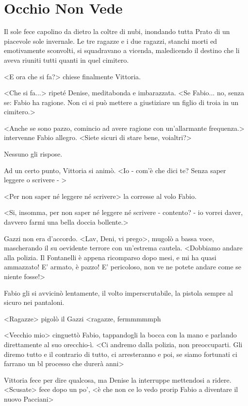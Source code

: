 \chapter{Occhio Non Vede}

Il sole fece capolino da dietro la coltre di nubi, inondando tutta Prato di un piacevole sole invernale. Le tre ragazze e i due ragazzi, stanchi morti ed emotivamente sconvolti, si squadravano a vicenda, maledicendo il destino che li aveva riuniti tutti quanti in quel cimitero.

<E ora che si fa?> chiese finalmente Vittoria.

<Che si fa...> ripeté Denise, meditabonda e imbarazzata. <Se Fabio... no, senza se: Fabio ha ragione. Non ci si può mettere a giustiziare un figlio di troia in un cimitero.>

<Anche se sono pazzo, comincio ad avere ragione con un'allarmante frequenza.> intervenne Fabio allegro. <Siete sicuri di stare bene, voialtri?>

Nessuno gli rispose.

Ad un certo punto, Vittoria si animò. <Io - com'è che dici te? Senza saper leggere o scrivere - >

<Per non saper né leggere né scrivere> la corresse al volo Fabio.

<Si, insomma, per non saper né leggere né scrivere - contento? - io vorrei daver, davvero farmi una bella doccia bollente.>

Gazzi non era d'accordo. <Lav, Deni, vi prego>, mugolò a bassa voce, mascherando il su oevidente terrore con un'estrema cautela. <Dobbiamo andare alla polizia. Il Fontanelli è appena ricomparso dopo mesi, e mi ha quasi ammazzato! E' armato, è pazzo! E' pericoloso, non ve ne potete andare come se niente fosse!>

Fabio gli si avvicinò lentamente, il volto imperscrutabile, la pistola sempre al sicuro nei pantaloni. 

<Ragazze> pigolò il Gazzi <ragazze, fermmmmmph

<Vecchio mio> cinguettò Fabio, tappandogli la bocca con la mano e parlando direttamente al suo orecchio-ì. <Ci andremo dalla polizia, non preoccuparti. Gli diremo tutto e il contrario di tutto, ci arresteranno e poi, se siamo fortunati ci farrano un bl processo che durerà anni>

Vittoria fece per dire qualcosa, ma Denise la interruppe mettendosi a ridere. <Scusate> fece dopo un po', <è che non ce lo vedo prorip Fabio a diventare il nuovo Pacciani>

